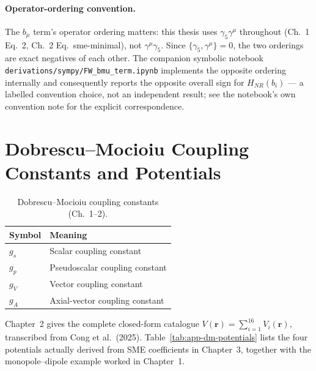 \documentclass[main]{subfiles}
\begin{document}
\paragraph{Operator-ordering convention.} The $b_\mu$ term's operator
ordering matters: this thesis uses $\gamma_5\gamma^\mu$ throughout (Ch.~1
Eq.~2, Ch.~2 Eq.~sme-minimal), not $\gamma^\mu\gamma_5$. Since
$\{\gamma_5,\gamma^\mu\}=0$, the two orderings are exact negatives of each
other. The companion symbolic notebook
\texttt{derivations/sympy/FW\_bmu\_term.ipynb} implements the opposite
ordering internally and consequently reports the opposite overall sign for
$H_{NR}(b_i)$ — a labelled convention choice, not an independent result;
see the notebook's own convention note for the explicit correspondence.

\section{Dobrescu--Mocioiu Coupling Constants and Potentials}

\begin{table}[h]
\centering
\begin{tabular}{@{}ll@{}}
\toprule
Symbol & Meaning \\
\midrule
$g_s$ & Scalar coupling constant \\
$g_p$ & Pseudoscalar coupling constant \\
$g_V$ & Vector coupling constant \\
$g_A$ & Axial-vector coupling constant \\
\bottomrule
\end{tabular}
\caption{Dobrescu--Mocioiu coupling constants (Ch.~1--2).}
\label{tab:app-dm-couplings}
\end{table}

Chapter~2 gives the complete closed-form catalogue
$V(\mathbf r)=\sum_{i=1}^{16}V_i(\mathbf r)$, transcribed from Cong et al.\
(2025). Table~\ref{tab:app-dm-potentials} lists the four potentials actually
derived from SME coefficients in Chapter~3, together with the
monopole--dipole example worked in Chapter~1.
\end{document}
